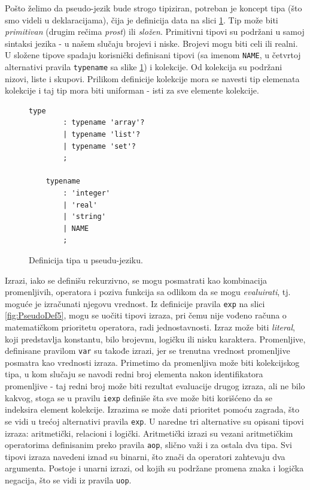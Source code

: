 Pošto želimo da pseudo-jezik bude strogo tipiziran, potreban je koncept tipa (što smo videli u deklaracijama), čija je definicija data na slici \ref{fig:PseudoDef4}. Tip može biti \emph{primitivan} (drugim rečima \emph{prost}) ili \emph{složen}. Primitivni tipovi su podržani u samoj sintaksi jezika - u našem slučaju brojevi i niske. Brojevi mogu biti celi ili realni. U složene tipove spadaju korisnički definisani tipovi (sa imenom \texttt{NAME}, u četvrtoj alternativi pravila \texttt{typename} sa slike \ref{fig:PseudoDef4}) i kolekcije. Od kolekcija su podržani nizovi, liste i skupovi. Prilikom definicije kolekcije mora se navesti tip elemenata kolekcije i taj tip mora biti uniforman - isti za sve elemente kolekcije. 

\begin{figure}[h!]
    \begin{lstlisting}[language={}]
    type 
        : typename 'array'?
        | typename 'list'?
        | typename 'set'?
        ;

    typename 
        : 'integer' 
        | 'real' 
        | 'string' 
        | NAME 
        ;
    \end{lstlisting}
    \caption{Definicija tipa u pseudu-jeziku.}
    \label{fig:PseudoDef4}
\end{figure}

Izrazi, iako se definišu rekurzivno, se mogu posmatrati kao kombinacija promenljivih, operatora i poziva funkcija sa odlikom da se mogu \emph{evaluirati}, tj. moguće je izračunati njegovu vrednost. Iz definicije pravila \texttt{exp} na slici \ref{fig:PseudoDef5}, mogu se uočiti tipovi izraza, pri čemu nije vođeno računa o matematičkom prioritetu operatora, radi jednostavnosti. Izraz može biti \emph{literal}, koji predstavlja konstantu, bilo brojevnu, logičku ili nisku karaktera. Promenljive, definisane pravilom \texttt{var} su takođe izrazi, jer se trenutna vrednost promenljive posmatra kao vrednosti izraza. Primetimo da promenljiva može biti kolekcijskog tipa, u kom slučaju se navodi redni broj elementa nakon identifikatora promenljive - taj redni broj može biti rezultat evaluacije drugog izraza, ali ne bilo kakvog, stoga se u pravilu \texttt{iexp} definiše šta sve može biti korišćeno da se indeksira element kolekcije. Izrazima se može dati prioritet pomoću zagrada, što se vidi u trećoj alternativi pravila \texttt{exp}. U naredne tri alternative su opisani tipovi izraza: aritmetički, relacioni i logički. Aritmetički izrazi su vezani aritmetičkim operatorima definisanim preko pravila \texttt{aop}, slično važi i za ostala dva tipa. Svi tipovi izraza navedeni iznad su binarni, što znači da operatori zahtevaju dva argumenta. Postoje i unarni izrazi, od kojih su podržane promena znaka i logička negacija, što se vidi iz pravila \texttt{uop}.

